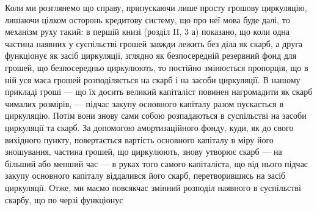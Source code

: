 Коли ми розглянемо що справу, припускаючи лише просту грошову
циркуляцію, лишаючи цілком осторонь кредитову систему, що про неї
мова буде далі, то механізм руху такий: в першій книзі (розділ II, 3 а)
показано, що коли одна частина наявних у суспільстві грошей завжди
лежить без діла як скарб, а друга функціонує як засіб циркуляції, зглядно
як безпосередній резервний фонд для грошей, що безпосередньо циркулюють,
то постійно змінюється пропорція, що в ній уся маса грошей
розподіляється на скарб і на засоби циркуляції. В нашому прикладі
гроші — що їх досить великий капіталіст повинен нагромадити як скарб
чималих розмірів, — підчас закупу основного капіталу разом пускається
в циркуляцію. Потім вони знову сами собою розпадаються в суспільстві
на засоби циркуляції та скарб. За допомогою амортизаційного фонду,
куди, як до свого вихідного пункту, повертається вартість основного капіталу
в міру його зношування, частина грошей, що циркулюють, знову
утворює скарб — на більший або менший час — в руках того самого капіталіста,
що від нього підчас закупу основного капіталу віддалився його
скарб, перетворившись на засіб циркуляції. Отже, ми маємо повсякчас
змінний розподіл наявного в суспільстві скарбу, що по черзі функціонує
\parbreak{}  %
